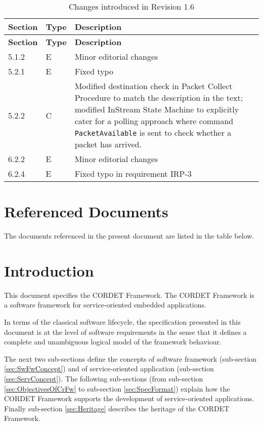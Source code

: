 \documentclass{pnp_article}
\begin{document}
\newpage
\begin{longtable}{|p{1.5cm}|p{1cm}|p{8cm}|}
\caption{Changes introduced in Revision 1.6}  \\
\hline
\rowcolor{light-gray}
\textbf{Section} & \textbf{Type} & \textbf{Description} \\
\hline\hline
\endfirsthead
\rowcolor{light-gray}
\textbf{Section} & \textbf{Type} & \textbf{Description} \\
\hline\hline
\endhead
5.1.2 & E & Minor editorial changes \\
\hline
5.2.1 & E & Fixed typo  \\
\hline
5.2.2 & C & Modified destination check in Packet Collect Procedure to match the description in the text; modified InStream State Machine to explicitly cater for a polling approach where command \texttt{PacketAvailable} is sent to check whether a packet has arrived. \\
\hline
6.2.2 & E & Minor editorial changes  \\
\hline
6.2.4 & E & Fixed typo in requirement IRP-3 \\
\hline
\end{longtable}

\section{Referenced Documents}

The documents referenced in the present document are listed in the table below.

\listofreferencedocs{\CrSp}

\section{Introduction}
This document specifies the CORDET Framework. The CORDET Framework is a software framework for service-oriented embedded applications. 

In terms of the classical software lifecycle, the specification presented in this document is at the level of software requirements in the sense that it defines a complete and unambiguous logical model of the framework behaviour.

The next two sub-sections define the concepts of software framework (sub-section \ref{sec:SwFwConcept}) and of service-oriented application (sub-section \ref{sec:ServConcept}). 
The following sub-sections (from sub-section \ref{sec:ObjectivesOfCrFw} to sub-section \ref{sec:SpecFormat}) explain how the CORDET Framework supports the development of service-oriented applications. 
Finally sub-section \ref{sec:Heritage} describes the heritage of the CORDET Framework.
\end{document}
